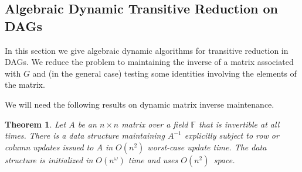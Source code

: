 \documentclass[11pt]{article}
\newtheorem{theorem}{Theorem}[section]
\newcommand{\arxivVsConference}[2]{#1}
\begin{document}
{
\let\section\subsection
\let\subsection\subsubsection


\newcommand{\Ot}{\ensuremath{\widetilde{O}}}
\newcommand{\eps}{\ensuremath{\epsilon}}
\newcommand{\field}{\mathbb{F}}

\section{Algebraic Dynamic Transitive Reduction on DAGs} \label{subsec:algebraic-dag}
In this section we give algebraic dynamic algorithms for transitive reduction
in DAGs\arxivVsConference{}{ (for general digraphs, see \Cref{sec:app_algebraic_general})}.
We reduce the problem to maintaining the inverse
of a matrix associated with $G$ and (in the general case) testing some identities involving the
elements of the matrix.


We will need the following results on dynamic matrix inverse maintenance. 

\begin{theorem}\label{thm:dyn-inv-rows}{\upshape\cite{Sankowski04}}
Let $A$ be an $n\times n$ matrix over a field $\field$ that is invertible at all times.
    There is a data structure maintaining $A^{-1}$ explicitly subject to
    row or column updates issued to $A$ in $O(n^2)$ worst-case update time. The data structure is initialized in $O(n^\omega)$ time and uses $O(n^2)$~space.
\end{theorem}

}
\end{document}
